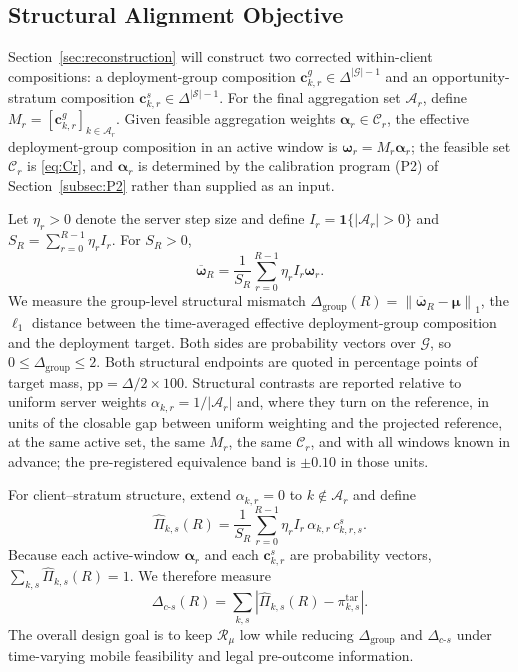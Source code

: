 \documentclass[letterpaper,journal]{IEEEtran}
\begin{document}
\subsection{Structural Alignment Objective}
\label{subsec:design_objective}

Section~\ref{sec:reconstruction} will construct two corrected within-client
compositions: a deployment-group composition
$\mathbf{c}^{g}_{k,r}\in\Delta^{|\mathcal{G}|-1}$ and an opportunity-stratum
composition $\mathbf{c}^{s}_{k,r}\in\Delta^{|\mathcal{S}|-1}$.  For the final
aggregation set $\mathcal{A}_r$, define
$M_r=[\mathbf{c}^{g}_{k,r}]_{k\in\mathcal{A}_r}$.  Given feasible aggregation
weights $\boldsymbol\alpha_r\in\mathcal{C}_r$, the effective deployment-group
composition in an active window is $\boldsymbol\omega_r=M_r\boldsymbol\alpha_r$;
the feasible set $\mathcal{C}_r$ is \eqref{eq:Cr}, and $\boldsymbol\alpha_r$ is
determined by the calibration program (P2) of Section~\ref{subsec:P2} rather than
supplied as an input.

Let $\eta_r>0$ denote the server step size and define
$I_r=\mathbf{1}\{|\mathcal{A}_r|>0\}$ and
$S_R=\sum_{r=0}^{R-1}\eta_r I_r$.
For $S_R>0$,
\begin{equation}
    \overline{\boldsymbol\omega}_R
    =
    \frac{1}{S_R}
    \sum_{r=0}^{R-1}
    \eta_r I_r\boldsymbol\omega_r.
    \label{eq:omega_bar}
\end{equation}
We measure the group-level structural mismatch
$\Delta_{\mathrm{group}}(R)=\left\|
\overline{\boldsymbol\omega}_R-\boldsymbol\mu
\right\|_1$,
the $\ell_1$ distance between the time-averaged effective deployment-group
composition and the deployment target.  Both sides are probability vectors
over $\mathcal{G}$, so $0\le\Delta_{\mathrm{group}}\le2$.  Both structural
endpoints are quoted in percentage points of target mass,
$\mathrm{pp}=\Delta/2\times100$.  Structural contrasts are reported relative to
uniform server weights $\alpha_{k,r}=1/|\mathcal{A}_r|$ and, where they turn on
the reference, in units of the closable gap between uniform weighting and the
projected reference, at the same active set, the same $M_r$, the same
$\mathcal{C}_r$, and with all windows known in advance; the pre-registered
equivalence band is $\pm0.10$ in those units.

For client--stratum structure, extend $\alpha_{k,r}=0$ to
$k\notin\mathcal{A}_r$ and define
\begin{equation}
 \widehat\Pi_{k,s}(R)
 =
 \frac{1}{S_R}
 \sum_{r=0}^{R-1}
 \eta_r I_r\,
 \alpha_{k,r}\,
 c^{s}_{k,r,s}.
 \label{eq:Pi_hat_ks}
\end{equation}
Because each active-window $\boldsymbol\alpha_r$ and each
$\mathbf{c}^{s}_{k,r}$ are probability vectors,
$\sum_{k,s}\widehat\Pi_{k,s}(R)=1$.  We therefore measure
\begin{equation}
 \Delta_{c\text{-}s}(R)
 =
 \sum_{k,s}
 \left|
 \widehat\Pi_{k,s}(R)-\pi^{\mathrm{tar}}_{k,s}
 \right|.
 \label{eq:delta_cs}
\end{equation}
The overall design goal is to keep $\mathcal{R}_{\mu}$ low while
reducing $\Delta_{\mathrm{group}}$ and $\Delta_{c\text{-}s}$ under
time-varying mobile feasibility and legal pre-outcome information.
\end{document}
